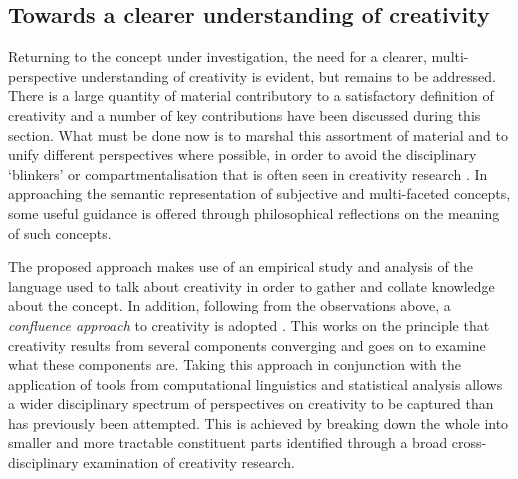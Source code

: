 \documentclass[10pt,letterpaper]{article}
\begin{document}
\subsection*{Towards a clearer understanding of creativity}\label{progressingForwards}

Returning to the concept under investigation, the need for a clearer, multi-perspective understanding of creativity is evident, but remains to be addressed. There is a large quantity of material contributory to a satisfactory definition of creativity and a number of key contributions have been discussed during this section. What must be done now is to marshal this assortment of material and to unify different perspectives where possible, in order to avoid the disciplinary `blinkers' or compartmentalisation that is often seen in creativity research \cite{hennessey10}. In approaching the semantic representation of subjective and multi-faceted concepts, some useful guidance is offered through philosophical reflections on the meaning of such concepts. 


The proposed approach makes use of an empirical study and analysis of the language used to talk about creativity in order to gather and collate knowledge about the concept. In addition, following from the observations above, a {\em  confluence approach\/} to creativity is adopted \cite{sternberg99a,mayer99,ivcevic09}. This works on the principle that creativity results from several components converging and goes on to examine what these components are. Taking this approach in conjunction with the application of tools from computational linguistics and statistical analysis allows a wider disciplinary spectrum of perspectives on creativity to be captured than has previously been attempted. This is achieved by breaking down the whole into smaller and more tractable constituent parts identified through a broad cross-disciplinary examination of creativity research. 


\end{document}
